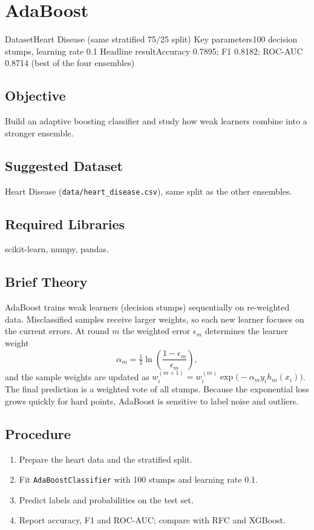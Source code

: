 \chapter{AdaBoost}\label{exp:11}


\quickfacts
  {Dataset}{Heart Disease (same stratified 75/25 split)}
  {Key parameters}{100 decision stumps, learning rate 0.1}
  {Headline result}{Accuracy 0.7895; F1 0.8182; ROC-AUC 0.8714 (best of the four ensembles)}

\section{Objective}
Build an adaptive boosting classifier and study how weak learners combine into a stronger
ensemble.

\section{Suggested Dataset}
Heart Disease (\texttt{data/heart\_disease.csv}), same split as the other ensembles.

\section{Required Libraries}
scikit-learn, numpy, pandas.

\section{Brief Theory}
AdaBoost trains weak learners (decision stumps) sequentially on re-weighted data.
Misclassified samples receive larger weights, so each new learner focuses on the current
errors. At round $m$ the weighted error $\epsilon_m$ determines the learner weight
\[
\alpha_m = \tfrac{1}{2}\ln\!\left(\frac{1-\epsilon_m}{\epsilon_m}\right),
\]
and the sample weights are updated as
$w_i^{(m+1)} = w_i^{(m)} \exp\!\bigl(-\alpha_m y_i h_m(x_i)\bigr)$.
The final prediction is a weighted vote of all stumps. Because the exponential loss grows
quickly for hard points, AdaBoost is sensitive to label noise and outliers.

\section{Procedure}
\begin{enumerate}
  \item Prepare the heart data and the stratified split.
  \item Fit \texttt{AdaBoostClassifier} with 100 stumps and learning rate 0.1.
  \item Predict labels and probabilities on the test set.
  \item Report accuracy, F1 and ROC-AUC; compare with RFC and XGBoost.
\end{enumerate}

